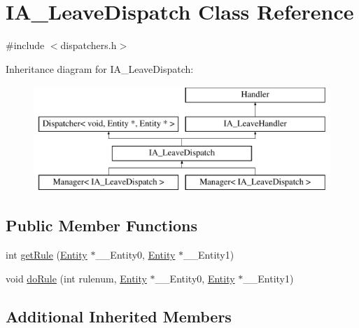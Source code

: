 \hypertarget{class_i_a___leave_dispatch}{\section{I\-A\-\_\-\-Leave\-Dispatch Class Reference}
\label{class_i_a___leave_dispatch}
}


{\ttfamily \#include $<$dispatchers.\-h$>$}

Inheritance diagram for I\-A\-\_\-\-Leave\-Dispatch\-:\begin{figure}[H]
\begin{center}
\leavevmode
\includegraphics[height=4.000000cm]{class_i_a___leave_dispatch}
\end{center}
\end{figure}
\subsection*{Public Member Functions}
\begin{DoxyCompactItemize}
\item 
int \hyperlink{class_i_a___leave_dispatch_a41be1f81e47a0fd1a67315165f2bbb89}{get\-Rule} (\hyperlink{class_entity}{Entity} $\ast$\-\_\-\-\_\-\-Entity0, \hyperlink{class_entity}{Entity} $\ast$\-\_\-\-\_\-\-Entity1)
\item 
void \hyperlink{class_i_a___leave_dispatch_a13f472a72cc1db91fc994a9b2aba7b9a}{do\-Rule} (int rulenum, \hyperlink{class_entity}{Entity} $\ast$\-\_\-\-\_\-\-Entity0, \hyperlink{class_entity}{Entity} $\ast$\-\_\-\-\_\-\-Entity1)
\end{DoxyCompactItemize}
\subsection*{Additional Inherited Members}


